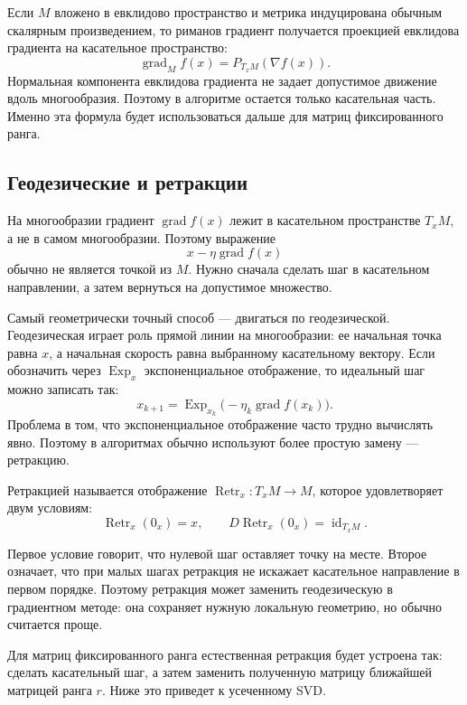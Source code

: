\documentclass[a4paper,12pt]{article}
\newcommand{\grad}{\operatorname{grad}}
\renewcommand{\Proj}{P}
\newcommand{\Retr}{\operatorname{Retr}}
\begin{document}
Если $M$ вложено в евклидово пространство и метрика индуцирована обычным скалярным произведением, то риманов градиент получается проекцией евклидова градиента на касательное пространство:
\[
    \grad_M f(x)=\Proj_{T_xM}(\nabla f(x)).
\]
Нормальная компонента евклидова градиента не задает допустимое движение вдоль многообразия. Поэтому в алгоритме остается только касательная часть. Именно эта формула будет использоваться дальше для матриц фиксированного ранга.

\subsection{Геодезические и ретракции}

На многообразии градиент $\grad f(x)$ лежит в касательном пространстве $T_xM$, а не в самом многообразии. Поэтому выражение
\[
    x-\eta \grad f(x)
\]
обычно не является точкой из $M$. Нужно сначала сделать шаг в касательном направлении, а затем вернуться на допустимое множество.

Самый геометрически точный способ --- двигаться по геодезической. Геодезическая играет роль прямой линии на многообразии: ее начальная точка равна $x$, а начальная скорость равна выбранному касательному вектору. Если обозначить через $\operatorname{Exp}_x$ экспоненциальное отображение, то идеальный шаг можно записать так:
\[
    x_{k+1}=\operatorname{Exp}_{x_k}\bigl(-\eta_k\grad f(x_k)\bigr).
\]
Проблема в том, что экспоненциальное отображение часто трудно вычислять явно. Поэтому в алгоритмах обычно используют более простую замену --- ретракцию.

\begin{definition}
    Ретракцией называется отображение $\Retr_x:T_xM\to M$, которое удовлетворяет двум условиям:
    \[
        \Retr_x(0_x)=x,
        \qquad
        D\Retr_x(0_x)=\operatorname{id}_{T_xM}.
    \]
\end{definition}

Первое условие говорит, что нулевой шаг оставляет точку на месте. Второе означает, что при малых шагах ретракция не искажает касательное направление в первом порядке. Поэтому ретракция может заменить геодезическую в градиентном методе: она сохраняет нужную локальную геометрию, но обычно считается проще.

Для матриц фиксированного ранга естественная ретракция будет устроена так: сделать касательный шаг, а затем заменить полученную матрицу ближайшей матрицей ранга $r$. Ниже это приведет к усеченному SVD.
\end{document}
